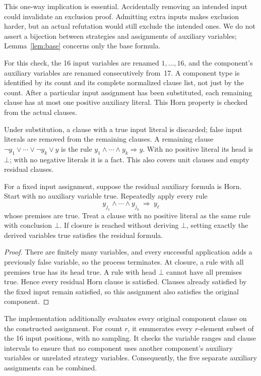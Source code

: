 This one-way implication is essential. Accidentally removing an intended
input could invalidate an exclusion proof. Admitting extra inputs makes
exclusion harder, but an actual refutation would still exclude the intended
ones. We do not assert a bijection between strategies and assignments of
auxiliary variables; Lemma~\ref{lem:base} concerns only the base formula.

For this check, the 16 input variables are renamed $1,\ldots,16$, and the
component's auxiliary variables are renamed consecutively from~17. A
component type is identified by its count and its complete normalized
clause list, not just by the count. After a particular input assignment
has been substituted, each remaining clause has at most one positive
auxiliary literal. This Horn property is checked from the actual clauses.

Under substitution, a clause with a true input literal is discarded;
false input literals are removed from the remaining clauses. A remaining
clause $\neg y_1\lor\cdots\lor\neg y_k\lor y$ is the rule
$y_1\land\cdots\land y_k\Rightarrow y$. With no positive literal its
head is $\bot$; with no negative literals it is a fact. This also covers
unit clauses and empty residual clauses.

\begin{lemma}\label{lem:horn}
For a fixed input assignment, suppose the residual auxiliary formula is
Horn. Start with no auxiliary variable true. Repeatedly apply every rule
\[
y_{j_1}\land\cdots\land y_{j_k}\ \Longrightarrow\ y_\ell
\]
whose premises are true. Treat a clause with no positive literal as the
same rule with conclusion $\bot$. If closure is reached without deriving
$\bot$, setting exactly the derived variables true satisfies the residual
formula.
\end{lemma}
\begin{proof}
There are finitely many variables, and every successful application adds
a previously false variable, so the process terminates. At closure, a
rule with all premises true has its head true. A rule with head $\bot$
cannot have all premises true. Hence every residual Horn clause is
satisfied. Clauses already satisfied by the fixed input remain satisfied,
so this assignment also satisfies the original component.
\end{proof}

The implementation additionally evaluates every original component clause
on the constructed assignment. For count $r$, it enumerates every
$r$-element subset of the 16 input positions, with no sampling. It checks
the variable ranges and clause intervals to ensure that no component uses
another component's auxiliary variables or unrelated strategy variables.
Consequently, the five separate auxiliary assignments can be combined.


